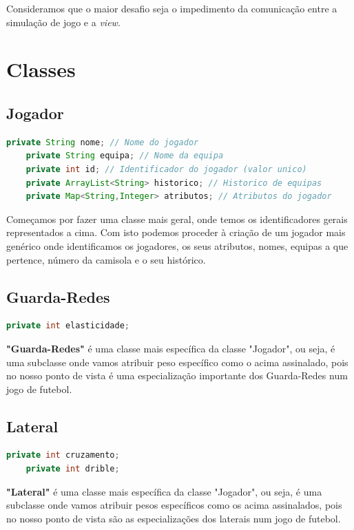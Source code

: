 \documentclass[a4paper]{report}
\begin{document}
	Consideramos que o maior desafio seja o impedimento da comunicação entre a simulação de jogo e a \emph{view}.
	
	\chapter{Classes}
	
	\section{Jogador}
	\begin{lstlisting}[language=java]
    private String nome; // Nome do jogador
    private String equipa; // Nome da equipa
    private int id; // Identificador do jogador (valor unico)
    private ArrayList<String> historico; // Historico de equipas
    private Map<String,Integer> atributos; // Atributos do jogador
	\end{lstlisting}
	
	Começamos por fazer uma classe mais geral, onde temos os identificadores gerais representados a cima. Com isto podemos proceder à criação de um jogador mais genérico onde identificamos os jogadores, os seus atributos, nomes, equipas a que pertence, número da camisola e o seu histórico.
	
	\section{Guarda-Redes}
	\begin{lstlisting}[language=Java]
    private int elasticidade;
	\end{lstlisting}
	
	\textbf{"Guarda-Redes"} é uma classe mais específica da classe "Jogador", ou seja, é uma subclasse onde vamos atribuir peso específico como o acima assinalado, pois no nosso ponto de vista é uma especialização importante dos Guarda-Redes num jogo de futebol.
	
	\section{Lateral}
	\begin{lstlisting}[language=Java]
    private int cruzamento;
    private int drible;
	\end{lstlisting}
	
	\textbf{"Lateral"} é uma classe mais específica da classe "Jogador", ou seja, é uma subclasse onde vamos atribuir pesos específicos como os acima assinalados, pois no nosso ponto de vista são as especializações dos laterais num jogo de futebol.
	
\end{document}
